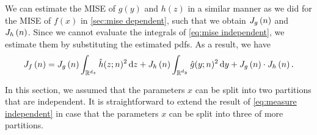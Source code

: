 We can estimate the MISE of $g(y)$ and $h(z)$ in a similar manner as we did for the MISE of $f(x)$ in \cref{sec:mise dependent}, such that we obtain $J_{g} \left( n \right)$ and $J_{h} \left( n \right)$. Since we cannot evaluate the integrals of \cref{eq:mise independent}, we estimate them by substituting the estimated pdfs. As a result, we have
\begin{dmath}
	\label{eq:measure independent}
	\measure{f}{n} = \measure{g}{n} \int_{\mathbb{R}^{d_z}} \hat{h}(z;n)^2 \ud z + \measure{h}{n} \int_{\mathbb{R}^{d_y}} \hat{g}(y;n)^2 \ud y + \measure{g}{n} \cdot \measure{h}{n}.
\end{dmath}

In this section, we assumed that the parameters $x$ can be split into two partitions that are independent. It is straightforward to extend the result of \cref{eq:measure independent} in case that the parameters $x$ can be split into three of more partitions. 
